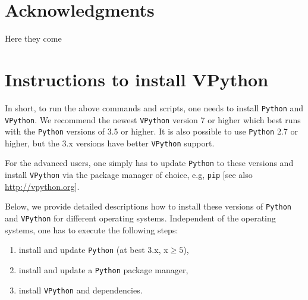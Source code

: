 \documentclass[12pt, UK english]{iopart}
\newcommand{\python}[0]{\texttt{Python}}
\newcommand{\vpython}[0]{\texttt{VPython}}
\begin{document}
\appendix



\section*{Acknowledgments}
Here they come



\section{Instructions to install VPython}\label{appendix:python}
In short, to run the above commands and scripts, one needs to install \python{} and \vpython{}.
We recommend the newest \vpython{} version 7 or higher which best runs with the \python{} versions of 3.5 or higher.
It is also possible to use \python{} 2.7 or higher, but the 3.x versions have better \vpython{} support.

For the advanced users, one simply has to update \python{} to these versions and install \vpython{} via the package manager of choice, e.g, \texttt{pip} [see also \url{http://vpython.org}].

Below, we provide detailed descriptions how to install these versions of \python{} and \vpython{} for different operating systems.
Independent of the operating systems, one has to execute the following steps:
\begin{enumerate}
	\item install and update \python{} (at best 3.x, x$\geq5$),
	\item install and update a \python{} package manager,
	\item install \vpython{} and dependencies.
\end{enumerate}

\end{document}
